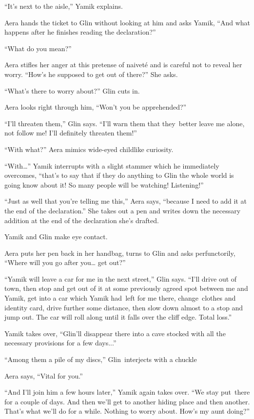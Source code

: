 \documentclass[twoside,11pt]{book}
\begin{document}
``It's next to the aisle,'' Yamik explains. 

Aera hands the ticket to Glin without looking at him and asks Yamik, ``And what happens after he finishes
reading the declaration?'' 

``What do you mean?'' 

Aera stifles her anger at this pretense of naivet\'e and is careful not to reveal her worry. ``How's he
supposed to get out of there?'' She asks.\ 

``What's there to worry about?'' Glin cuts in{.}

Aera looks right through him, ``Won't you be apprehended?'' 

``I'll threaten them,'' Glin says. ``I'll warn them that they\ better leave me
alone, not follow me! I'll definitely threaten them!''

``With what?'' Aera mimics wide-eyed childlike curiosity.

``With{\dots}'' Yamik interrupts with a slight stammer which he immediately overcomes,
``that's to say that if they do anything to Glin the whole world is going know about it! So many people
will be watching! Listening!''

``Just as well that you're telling me this,'' Aera says, ``because I need to add
it at the end of the declaration.'' She takes out a pen and writes down the necessary addition at the end
of the declaration she's drafted. 

Yamik and Glin make eye contact. 

Aera puts her pen back in her handbag, turns to Glin and asks perfunctorily, ``Where will you go after
you{\dots} get out?'' 

``Yamik will leave a car for me in the next street,'' Glin says. ``I'll drive out
of town, then stop and get out of it at some previously agreed spot between me and Yamik, get into a car which Yamik
had\ left for me there, change\ clothes and identity card, drive further some distance, then slow down almost to a stop
and jump out. The car will roll along until it falls over the cliff edge. Total loss.'' 

Yamik takes over, ``Glin'll disappear there into a cave stocked with all the necessary provisions for a few
days...'' 

``Among them a pile of my discs,'' Glin\ interjects with a chuckle\ 

Aera says, ``Vital for you.'' 

``And I{}'ll join him a few hours later,'' Yamik again takes over. ``We stay
put~there for a couple of days. And then we'll get to another hiding place and then another. That's what we'll do for a
while. Nothing to worry about. How's my aunt doing?'' 
\end{document}
